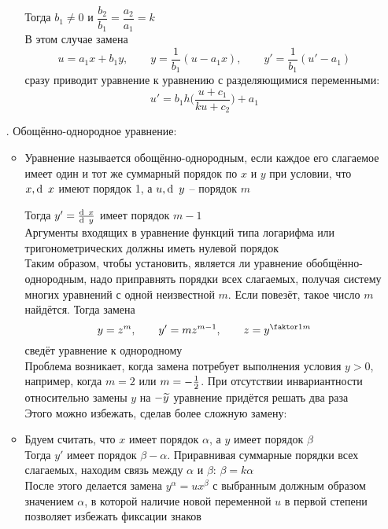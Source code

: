 \begin{enumerate}
\begin{itemize}
        \begin{figure}[!ht]
        \end{figure} \\
        Тогда $ b_1 \ne 0 $ и $ \dfrac{b_2}{b_1} = \dfrac{a_2}{a_1} = k $ \\
        В этом случае замена
        $$ u = a_1x + b_1y, \qquad y = \frac1{b_1}(u - a_1x), \qquad y' = \frac1{b_1}(u' - a_1) $$
        сразу приводит уравнение к уравнению с разделяющимися переменными:
        $$ u' = b_1h \bigg( \frac{u + c_1}{ku + c_2} \bigg) + a_1 $$
    \end{itemize}
    \item[\rom8.] Обощённо-однородное уравнение:
    \begin{itemize}
    	\item
        \begin{definition}
            Уравнение называется обощённо-однородным, если каждое его слагаемое имеет один и тот же суммарный порядок по $ x $ и $ y $ при условии, что $ x, \di x $ имеют порядок 1, а $ u, \di y $ -- порядок $ m $
        \end{definition}
        Тогда $ y' = \frac{\di x}{\di y} $ имеет порядок $ m - 1 $ \\
        Аргументы входящих в уравнение функций типа логарифма или тригонометрических должны иметь нулевой порядок \\
        Таким образом, чтобы установить, является ли уравнение обобщённо-однородным, надо приправнять порядки всех слагаемых, получая систему многих уравнений с одной неизвестной $ m $. Если повезёт, такое число $ m $ найдётся. Тогда замена
        $$ y = z^m, \qquad y' = mz^{m - 1}, \qquad z = y^{\faktor1m} $$
        сведёт уравнение к однородному \\
        Проблема возникает, когда замена потребует выполнения условия $ y > 0 $, например, когда $ m = 2 $ или $ m = -\frac{1}2 $. При отсутствии инвариантности относительно замены $ y $ на $ -\widetilde{y} $ уравнение придётся решать два раза \\
        Этого можно избежать, сделав более сложную замену:
        \item Бдуем считать, что $ x $ имеет порядок $ \alpha $, а $ y $ имеет порядок $ \beta $ \\
        Тогда $ y' $ имеет порядок $ \beta - \alpha $. Приравнивая суммарные порядки всех слагаемых, находим связь между $ \alpha $ и $ \beta $: $ \beta = k\alpha $ \\
        После этого делается замена $ y^\alpha = ux^\beta $ с выбранным должным образом значением $ \alpha $, в которой наличие новой переменной $ u $ в первой степени позволяет избежать фиксации знаков
    \end{itemize}
\end{enumerate}
